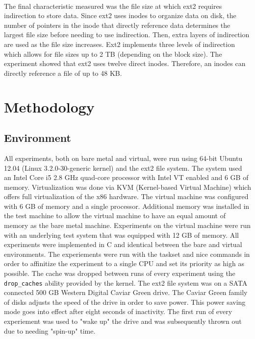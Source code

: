 \documentclass[letterpaper,twocolumn,10pt]{article}
\begin{document}
\paragraph{}
The final characteristic measured was the file size at which ext2 requires indirection to store data. 
Since ext2 uses inodes to organize data on disk, the number of pointers in the inode that directly reference data determines the largest file size before needing to use indirection. 
Then, extra layers of indirection are used as the file size increases. 
Ext2 implements three levels of indirection which allows for file sizes up to 2 TB (depending on the block size). 
The experiment showed that ext2 uses twelve direct inodes. 
Therefore, an inodes can directly reference a file of up to 48 KB. 

\section{Methodology}
\subsection{Environment}
All experiments, both on bare metal and virtual, were run using 64-bit Ubuntu 12.04 (Linux 3.2.0-30-generic kernel) and the ext2 file system.
The system used an Intel Core i5 2.8 GHz quad-core processor with Intel VT enabled and 6 GB of memory.
Virtualization was done via KVM (Kernel-based Virtual Machine) which offers full virtualization of the x86 hardware.
The virtual machine was configured with 6 GB of memory and a single processor.
Additional memory was installed in the test machine to allow the virtual machine to have an equal amount of memory as the bare metal machine.
Experiments on the virtual machine were run with an underlying test system that was equipped with 12 GB of memory.
All experiments were implemented in C and identical between the bare and virtual environments. 
The experiements were run with the taskset and nice commands in order to affinitize the experiment to a single CPU and set its priority as high as possible.
The cache was dropped between runs of every experiment using the \texttt{drop\_caches} ability provided by the kernel.
The ext2 file system was on a SATA connected 500 GB Western Digital Caviar Green drive. 
The Caviar Green family of disks adjusts the speed of the drive in order to save power. 
This power saving mode goes into effect after eight seconds of inactivity.
The first run of every experiement was used to "wake up" the drive and was subsequently thrown out due to needing "spin-up" time. 
\end{document}
